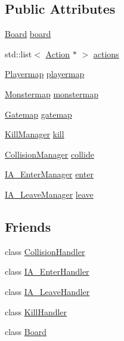 \subsection*{Public Attributes}
\begin{DoxyCompactItemize}
\item 
\hyperlink{class_board}{Board} \hyperlink{class_game_af5bc546b0c766ecf2f7e008f750832ed}{board}
\item 
std\-::list$<$ \hyperlink{class_action}{Action} $\ast$ $>$ \hyperlink{class_game_a8e61c60693aa39b8a3deb5f3f277b43f}{actions}
\item 
\hyperlink{class_game_a11e553861e3a7fc842680e55171ed06f}{Playermap} \hyperlink{class_game_a80a6b1acda9236fe3b7fe0350798c177}{playermap}
\item 
\hyperlink{class_game_a2c39481e575abd66baa206771c504149}{Monstermap} \hyperlink{class_game_a258c0d85bedcded80253fa4727893e5f}{monstermap}
\item 
\hyperlink{class_game_a3ac788aaa1e70509a9b9745acd17a8b5}{Gatemap} \hyperlink{class_game_a1d765a83bc51abcacd6d29982e8f1334}{gatemap}
\item 
\hyperlink{collisionmanager_8h_a68b133893cc2135753d73d2eb67d8862}{Kill\-Manager} \hyperlink{class_game_a5e85f7712e3de31f39c90fb67faa8810}{kill}
\item 
\hyperlink{collisionmanager_8h_aa6e6f4ef51ae9973907d531f6b4a1185}{Collision\-Manager} \hyperlink{class_game_aa2a0d5dc6a9af51c8b34c2cf27284d4a}{collide}
\item 
\hyperlink{collisionmanager_8h_ad2f95bbc2be9cd96bdcf6e78d8f2c68f}{I\-A\-\_\-\-Enter\-Manager} \hyperlink{class_game_a74330f1be42a0084acb37b91ef89664a}{enter}
\item 
\hyperlink{collisionmanager_8h_a197a12544b0eb494b21e8808db01dc7f}{I\-A\-\_\-\-Leave\-Manager} \hyperlink{class_game_ace7ec571f69a4a210e5a4d1f80232753}{leave}
\end{DoxyCompactItemize}
\subsection*{Friends}
\begin{DoxyCompactItemize}
\item 
class \hyperlink{class_game_ab0955901615f29e137d1ad6b95fc2c55}{Collision\-Handler}
\item 
class \hyperlink{class_game_ad46435fe6b8e9a384d33d608058862ae}{I\-A\-\_\-\-Enter\-Handler}
\item 
class \hyperlink{class_game_adc4c20007ad2fd4bc2556fbfbff54945}{I\-A\-\_\-\-Leave\-Handler}
\item 
class \hyperlink{class_game_aab5a016b7fd0a16c4e689d3102ec3a17}{Kill\-Handler}
\item 
class \hyperlink{class_game_a12525b6ed7c8186be0bee5cf78e2a49c}{Board}
\end{DoxyCompactItemize}


